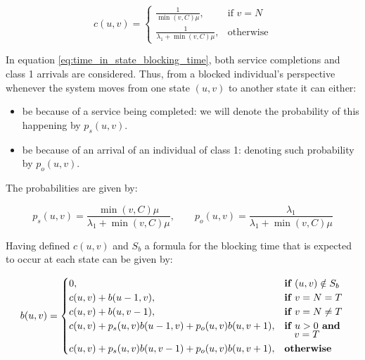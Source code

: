 \begin{equation}\label{eq:time_in_state_blocking_time}
    c(u,v) = 
    \begin{cases}
        \frac{1}{\min(v,C) \mu}, & \text{if } v = N\\
        \frac{1}{\lambda_1 + \min(v,C) \mu}, & \text{otherwise}
    \end{cases}
\end{equation}
 
In equation \ref{eq:time_in_state_blocking_time}, both service completions and 
class 1 arrivals are considered. 
Thus, from a blocked individual's perspective whenever the system moves from one 
state \((u,v)\)
to another state it can either:

\begin{itemize}
    \item be because of a service being completed: we will denote the probability 
    of this happening by \(p_s(u,v)\). 
    \item be because of an arrival of an individual of class 1: denoting such 
    probability by \(p_o(u,v)\).
\end{itemize}
The probabilities are given by:

\begin{equation*}
    p_s(u,v) = \frac{\min(v,C)\mu}{\lambda_1 + \min(v,C)\mu}, \qquad
    p_o(u,v) = \frac{\lambda_1}{\lambda_1 + \min(v,C)\mu}
\end{equation*}


Having defined \(c(u,v)\) and \(S_b\) a formula for the blocking time that is
expected to occur at each state can be given by:

\begin{equation}\label{eq:general_blocking_time_at_each_state}
    b(u,v) = 
    \begin{cases} 
        0, & \textbf{if } (u,v) \notin S_b \\
        c(u,v) + b(u - 1, v), & \textbf{if } v = N = T\\
        c(u,v) + b(u, v-1), & \textbf{if } v = N \neq T \\
        c(u,v) + p_s(u,v) b(u-1, v) + p_o(u,v) b(u, v+1), & \textbf{if } u > 0 
        \textbf{ and } \vspace{-0.2cm} \\ 
        & \quad v = T \\
        c(u,v) + p_s(u,v) b(u, v-1) + p_o(u,v) b(u, v+1), & \textbf{otherwise} \\
    \end{cases}
\end{equation}

